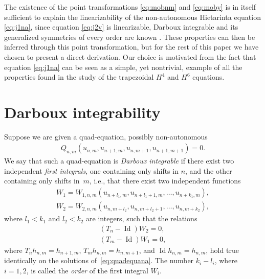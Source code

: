 \documentclass[pdftex]{sigma}
\numberwithin{equation}{section}
\DeclareMathOperator{\Id}{Id}
\begin{document}
The existence of the point transformations \eqref{eq:mobnm}
and \eqref{eq:moby} is in itself suf\/f\/icient to explain the linearizability
of the non-autonomous Hietarinta equation \eqref{eq:j1na},
since equation \eqref{eq:j2v} is linearizable,
Darboux integrable and its generalized symmetries of every order
are known \cite{GSL_Pavel}.
These properties can then be inferred through this point
transformation, but for the rest of this paper we have chosen
to present a direct derivation.
Our choice is motivated from the fact that equation \eqref{eq:j1na}
can be seen as a simple, yet nontrivial, example of all the properties
found in the study of the trapezoidal $H^{4}$ and $H^{6}$ equations.

\section{Darboux integrability}\label{sec:darb}

Suppose we are given a quad-equation, possibly non-autonomous
\begin{gather}\label{eq:quadequana}
 Q_{n,m}( u_{n,m},u_{n+1,m},u_{n,m+1},u_{n+1,m+1} )=0.
\end{gather}
We say that such a quad-equation is \emph{Darboux integrable}
if there exist two independent \emph{first integrals},
one containing only shifts in $n$, and the other containing only shifts in~$m$,
i.e., that there exist two independent functions
 \begin{gather*}
 W_1=W_{1,n,m}(u_{n+l_1,m},u_{n+l_1+1,m},\ldots,u_{n+k_1,m}), \label{eq:darbfint1} \\
 W_2=W_{2,n,m}(u_{n,m+l_2},u_{n,m+l_2+1},\ldots,u_{n,m+k_2}), \label{eq:darbfint2}
 \end{gather*}
where $l_1<k_1$ and $l_2<k_2$ are integers, such that the relations
\begin{subequations}\label{eq:darbdef}
 \begin{gather*}
 (T_n-\Id)W_2=0, \label{eq:darb1} \\
 (T_m-\Id)W_1=0,  \label{eq:darb2}
 \end{gather*}
\end{subequations}
where $T_n h_{n,m}=h_{n+1,m}$, $T_m h_{n,m}=h_{n,m+1}$,
and $\Id h_{n,m}=h_{n,m}$, hold true identically on the solutions of~\eqref{eq:quadequana}.
The number $k_{i}-l_{i}$, where $i=1,2$, is called the \emph{order} of
the f\/irst integral $W_{i}$.
\end{document}
